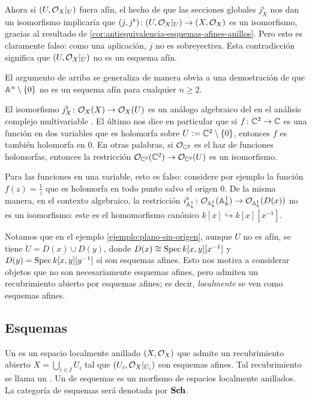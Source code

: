 \documentclass{article}
\numberwithin{equation}{section}
\theoremstyle{definition}
\begin{document}
\begin{ejemplo}
  Ahora si $(U, \O_X|_U)$ fuera afín, el hecho de que las secciones globales
  $j_X^\flat$ nos dan un isomorfismo implicaría que
  $(j,j^\flat)\colon (U, \O_X|_U) \to (X, \O_X)$ es un isomorfismo, gracias
  al resultado de \ref{cor:antiequivalencia-esquemas-afines-anillos}. Pero esto
  es claramente falso: como una aplicación, $j$ no es sobreyectiva.
  Esta contradicción significa que $(U,\O_X|_U)$ no es un esquema afín.
\end{ejemplo}

El argumento de arriba se generaliza de manera obvia a una demostración de que
$\AA^n \setminus \{ 0 \}$ no es un esquema afín para cualquier $n \ge 2$.

\begin{comentario}
  El isomorfismo $j_X^\flat\colon \O_X (X) \to \O_X (U)$ es un análogo
  algebraico del  en el análisis complejo
  multivariable \cite[Theorem 1.2.6]{Krantz-several}. El último nos dice
  en particular que si $f\colon \CC^2 \to \CC$ es una función en dos variables
  que es holomorfa sobre $U \dfn \CC^2 \setminus \{ 0 \}$, entonces $f$
  es también holomorfa en $0$. En otras palabras, si $\O_{\CC^2}$ es
  el haz de funciones holomorfas, entonces la restricción
  $\O_{\CC^2} (\CC^2) \to \O_{\CC^2} (U)$ es un isomorfismo.

  Para las funciones en una variable, esto es falso: considere por ejemplo
  la función $f (z) = \frac{1}{z}$ que es holomorfa en todo punto salvo el
  origen $0$. De la misma manera, en el contexto algebraico, la restricción
  $i_{\AA^1_k}^\flat\colon \O_{\AA^1_k} (\AA^1_k) \to \O_{\AA^1_k} (D (x))$
  no es un isomorfismo: este es el homomorfismo canónico
  $k [x] \hookrightarrow k[x][x^{-1}]$.
\end{comentario}

Notamos que en el ejemplo \ref{ejemplo:plano-sin-origen}, aunque $U$ no es afín,
se tiene $U = D (x) \cup D (y)$, donde $D (x) \isom \Spec k [x,y] [x^{-1}]$ y
$D (y) = \Spec k [x,y] [y^{-1}]$ sí son esquemas afines. Esto nos motiva
a considerar objetos que no son necesariamente esquemas afines, pero admiten
un recubrimiento abierto por esquemas afines; es decir, \emph{localmente} se ven
como esquemas afines.

\subsection{Esquemas}

\begin{definicion}
  \label{dfn:esquemas}
  Un  es un espacio localmente anillado $(X, \O_X)$ que admite
  un recubrimiento abierto $X = \bigcup_{i\in I} U_i$ tal que
  $(U_i, \O_X|_{U_i})$ son esquemas afines. Tal recubrimiento se llama
  un . Un  de esquemas es
  un morfismo de espacios localmente anillados. La categoría de esquemas será
  denotada por $\categ{Sch}$.
\end{definicion}
\end{document}
